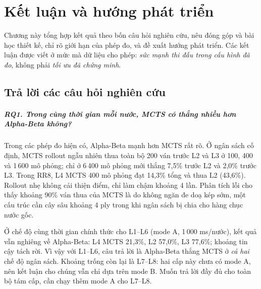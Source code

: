 \chapter{Kết luận và hướng phát triển}
\label{ch:ket-luan}

Chương này tổng hợp kết quả theo bốn câu hỏi nghiên cứu, nêu đóng góp và bài học thiết kế, chỉ
rõ giới hạn của phép đo, và đề xuất hướng phát triển. Các kết luận được viết ở mức mà dữ liệu
cho phép: \emph{sức mạnh thi đấu trong cấu hình đã đo}, không phải \emph{tối ưu đã chứng minh}.

\section{Trả lời các câu hỏi nghiên cứu}
\label{sec:kl-rq}

\paragraph{RQ1. Trong cùng thời gian mỗi nước, MCTS có thắng nhiều hơn Alpha-Beta không?}
Trong các phép đo hiện có, Alpha-Beta mạnh hơn MCTS rất rõ. Ở ngân sách cố định, MCTS rollout
ngẫu nhiên thua toàn bộ 200 ván trước L2 và L3 ở 100, 400 và 1\,600 mô phỏng; chỉ ở 6\,400 mô
phỏng mới thắng 7,5\% trước L2 và 2,0\% trước L3. Trong RR8, L4 MCTS 400 mô phỏng đạt 14,3\%
tổng và thua L2 (43,6\%). Rollout nhẹ không cải thiện điểm, chỉ làm chậm khoảng 4 lần. Phân
tích lỗi cho thấy khoảng 90\% ván thua của MCTS là do không ngăn đe doạ kép sớm, một cấu trúc
cần cây sâu khoảng 4 ply trong khi ngân sách bị chia cho hàng chục nước gốc.

Ở chế độ cùng thời gian chính thức cho L1--L6 (mode A, 1\,000 ms/nước), kết quả vẫn nghiêng
về Alpha-Beta: L4 MCTS 21,3\%, L2 57,0\%, L3 77,6\%; khoảng tin cậy tách rời. Vì vậy với
L1--L6, câu trả lời là Alpha-Beta thắng MCTS ở \emph{cả hai} chế độ ngân sách. Khoảng trống
còn lại là L7--L8: hai cấp này chưa có mode A, nên kết luận cho chúng vẫn chỉ dựa trên mode B.
Muốn trả lời đầy đủ cho toàn bộ tám cấp, cần chạy thêm mode A cho L7--L8.

